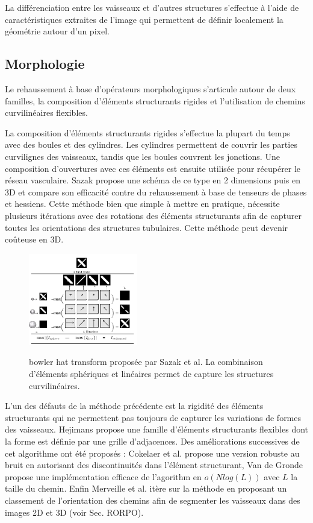 La différenciation entre les vaisseaux et d'autres structures s'effectue à l'aide de caractéristiques extraites de l'image qui permettent de définir localement la géométrie autour d'un pixel. 

\subsection{Morphologie}
\label{sec:EA:rehaussement:morpho}

Le rehaussement à base d'opérateurs morphologiques s'articule autour de deux familles, la composition d'éléments structurants rigides et l'utilisation de chemins curvilinéaires flexibles.

La composition d'éléments structurants rigides s'effectue la plupart du temps avec des boules et des cylindres. Les cylindres permettent de couvrir les parties curvilignes des vaisseaux, tandis que les boules couvrent les jonctions. Une composition d'ouvertures avec ces éléments est ensuite utilisée pour récupérer le réseau vasculaire. Sazak propose une schéma de ce type en 2 dimensions \cite{Sazak2019_bowler_hat_2D} puis en 3D \cite{Sazak2018_bowler_hat_3D} et compare son efficacité contre du rehaussement à base de tenseurs de phases et hessiens. Cette méthode bien que simple à mettre en pratique, nécessite plusieurs itérations avec des rotations des éléments structurants afin de capturer toutes les orientations des structures tubulaires. Cette méthode peut devenir coûteuse en 3D.

\begin{figure}[h]
  \centering
  \includegraphics[height=4cm]{Images/bowlerHat_3D.png}
  \label{fig:sazak_bowler_hat}
  \caption{bowler hat transform proposée par Sazak et al. La combinaison d'éléments sphériques et linéaires permet de capture les structures curvilinéaires. }
\end{figure}

L'un des défauts de la méthode précédente est la rigidité des éléments structurants qui ne permettent pas toujours de capturer les variations de formes des vaisseaux. Hejimans \cite{Heijmans2005_path_opening} propose une famille d'éléments structurants flexibles dont la forme est définie par une grille d'adjacences. Des améliorations successives de cet algorithme ont été proposés : Cokelaer et al. \cite{Cokelaer2012_efficient_path_opening} propose une version robuste au bruit en autorisant des discontinuités dans l'élément structurant, Van de Gronde \cite{Gronde2015_fast_path_opening} propose une implémentation efficace de l'agorithm en $o( N log ( L ))$ avec $L$ la taille du chemin. Enfin Merveille et al. \cite{Merveille2018_curvilinear} itère sur la méthode en proposant un classement de l'orientation des chemins afin de segmenter les vaisseaux dans des images 2D et 3D (voir Sec. RORPO). 


